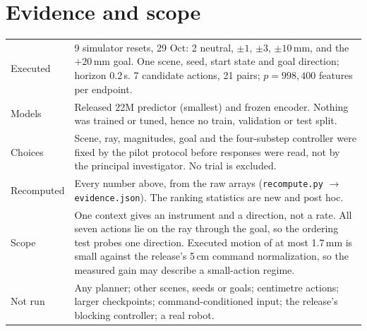 \documentclass[10pt]{article}
\begin{document}
\section{Evidence and scope}
\vspace{-6pt}
\begin{table}[H]\centering\footnotesize
\setlength{\tabcolsep}{5pt}\renewcommand{\arraystretch}{1.08}
\begin{tabular}{@{}p{}p{}@{}}
\toprule
Executed & 9 simulator resets, 29 Oct: 2 neutral, $\pm1$, $\pm3$, $\pm10$\,mm, and the $+20$\,mm goal. One scene, seed, start state and goal direction; horizon 0.2\,s. 7 candidate actions, 21 pairs; $p=998{,}400$ features per endpoint. \\
Models & Released 22M predictor (smallest) and frozen encoder. Nothing was trained or tuned, hence no train, validation or test split. \\
Choices & Scene, ray, magnitudes, goal and the four-substep controller were fixed by the pilot protocol before responses were read, not by the principal investigator. No trial is excluded. \\
Recomputed & Every number above, from the raw arrays (\texttt{recompute.py} $\to$ \texttt{evidence.json}). The ranking statistics are new and post hoc. \\
Scope & One context gives an instrument and a direction, not a rate. All seven actions lie on the ray through the goal, so the ordering test probes one direction. Executed motion of at most 1.7\,mm is small against the release's 5\,cm command normalization, so the measured gain may describe a small-action regime. \\
Not run & Any planner; other scenes, seeds or goals; centimetre actions; larger checkpoints; command-conditioned input; the release's blocking controller; a real robot. \\
\bottomrule
\end{tabular}
\end{table}

\end{document}
